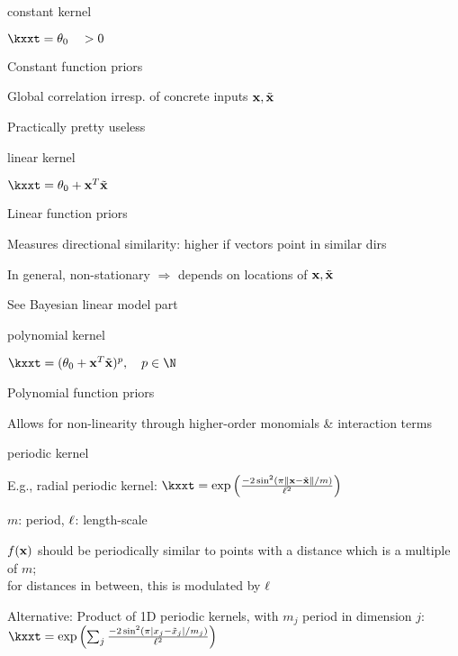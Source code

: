 \documentclass[11pt,compress,t,notes=noshow, xcolor=table]{beamer}
\begin{document}
\begin{framei}{constant kernel}
\item $\kxxt = \theta_0 \quad > 0$
\item Constant function priors
\item Global correlation irresp. of concrete inputs $\mathbf{x}, \tilde{\mathbf{x}}$
\item Practically pretty useless
\vfill
{}
\end{framei}

\begin{framei}{linear kernel}
\item $\kxxt = \theta_0 + \xv^T \xtil$
\item Linear function priors
\item Measures directional similarity: higher if vectors point in similar dirs
\item In general, non-stationary $\Rightarrow$ depends on locations of $\mathbf{x}, \tilde{\mathbf{x}}$
\item See Bayesian linear model part
\vfill
{}
\end{framei}

\begin{framei}{polynomial kernel}
\item $\kxxt = (\theta_0 + \xv^T \xtil )^p, \quad p \in \N$
\item Polynomial function priors
\item Allows for non-linearity through higher-order monomials \& interaction terms
\vfill
{}
\end{framei}

\begin{framei}{periodic kernel}
\item E.g., radial periodic kernel: $\kxxt = \exp \left(\frac{-2\sin^2 (\pi \xxtnorm / m)}{\ls^2} \right)$
\item $m$: period, $\ell$: length-scale
\item $f(\mathbf{x})$ should be periodically similar to points with a distance which is a multiple of $m$;\\
for distances in between, this is modulated by $\ell$
\item Alternative: Product of 1D periodic kernels, with $m_j$ period in dimension $j$: $\kxxt =  \exp \left(\sum_j\frac{-2\sin^2 (\pi |x_j - \tilde{x}_j| / m_j)}{\ls^2} \right)$
\vfill
{}
\end{framei}
\end{document}

